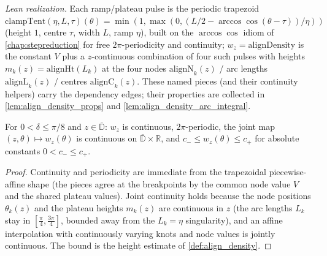 \begin{definition}
  \emph{Lean realization.} Each ramp/plateau pulse is the periodic trapezoid
  $\mathrm{clampTent}(\eta,L,\tau)(\theta)=\min(1,\max(0,(L/2-\arccos\cos(\theta-\tau))/\eta))$
  (height $1$, centre $\tau$, width $L$, ramp $\eta$), built on the
  $\arccos\cos$ idiom of \cref{chap:stepreduction} for free $2\pi$-periodicity and
  continuity; $w_z=\mathrm{alignDensity}$ is the constant $V$ plus a $z$-continuous
  combination of four such pulses with heights $m_k(z)=\mathrm{alignHt}(L_k)$ at the
  four nodes $\mathrm{alignN}_k(z)$ / arc lengths $\mathrm{alignL}_k(z)$ / centres
  $\mathrm{alignC}_k(z)$.  These named pieces (and their continuity helpers) carry the
  dependency edges; their properties are collected in \cref{lem:align_density_props}
  and \cref{lem:align_density_arc_integral}.
\end{definition}

\begin{lemma}
  \label{lem:align_density_props}
  For $0<\delta\le\pi/8$ and $z\in\overline{\mathbb D}$: $w_z$ is continuous,
  $2\pi$-periodic, the joint map $(z,\theta)\mapsto w_z(\theta)$ is continuous on
  $\overline{\mathbb D}\times\mathbb R$, and $c_-\le w_z(\theta)\le c_+$ for
  absolute constants $0<c_-\le c_+$.
\end{lemma}
\begin{proof}
  Continuity and periodicity are immediate from the trapezoidal piecewise-affine
  shape (the pieces agree at the breakpoints by the common node value $V$ and the
  shared plateau values). Joint continuity holds because the node positions
  $\theta_k(z)$ and the plateau heights $m_k(z)$ are continuous in $z$ (the arc
  lengths $L_k$ stay in $[\tfrac\pi4,\tfrac{3\pi}4]$, bounded away from the
  $L_k=\eta$ singularity), and an affine interpolation with continuously varying
  knots and node values is jointly continuous. The bound is the height estimate of
  \cref{def:align_density}.
\end{proof}

